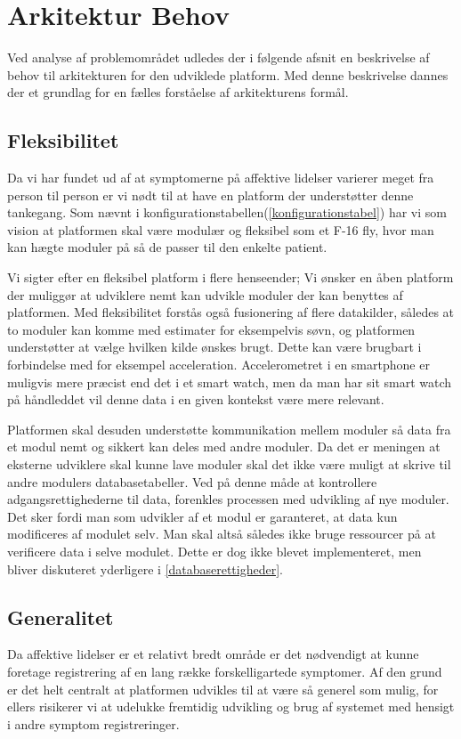 \section{Arkitektur Behov}\label{arkitekturkrav}
Ved analyse af problemområdet udledes der i følgende afsnit en beskrivelse af behov til arkitekturen for den udviklede platform.
Med denne beskrivelse dannes der et grundlag for en fælles forståelse af arkitekturens formål.

\subsection{Fleksibilitet}
Da vi har fundet ud af at symptomerne på affektive lidelser varierer meget fra person til person er vi nødt til at have en platform der understøtter denne tankegang.
Som nævnt i konfigurationstabellen(\cref{konfigurationstabel}) har vi som vision at platformen skal være modulær og fleksibel som et F-16 fly, hvor man kan hægte moduler på så de passer til den enkelte patient.

Vi sigter efter en fleksibel platform i flere henseender;
Vi ønsker en åben platform der muliggør at udviklere nemt kan udvikle moduler der kan benyttes af platformen.
Med fleksibilitet forstås også fusionering af flere datakilder, således at to moduler kan komme med estimater for eksempelvis søvn, og platformen understøtter at vælge hvilken kilde ønskes brugt.
Dette kan være brugbart i forbindelse med for eksempel acceleration.
Accelerometret i en smartphone er muligvis mere præcist end det i et smart watch, men da man har sit smart watch på håndleddet vil denne data i en given kontekst være mere relevant.

Platformen skal desuden understøtte kommunikation mellem moduler så data fra et modul nemt og sikkert kan deles med andre moduler.
Da det er meningen at eksterne udviklere skal kunne lave moduler skal det ikke være muligt at skrive til andre modulers databasetabeller.
Ved på denne måde at kontrollere adgangsrettighederne til data, forenkles processen med udvikling af nye moduler.
Det sker fordi man som udvikler af et modul er garanteret, at data kun modificeres af modulet selv.
Man skal altså således ikke bruge ressourcer på at verificere data i selve modulet.
Dette er dog ikke blevet implementeret, men bliver diskuteret yderligere i \cref{databaserettigheder}.

\subsection{Generalitet}
Da affektive lidelser er et relativt bredt område er det nødvendigt at kunne foretage registrering af en lang række forskelligartede symptomer.
Af den grund er det helt centralt at platformen udvikles til at være så generel som mulig, for ellers risikerer vi at udelukke fremtidig udvikling og brug af systemet med hensigt i andre symptom registreringer.

